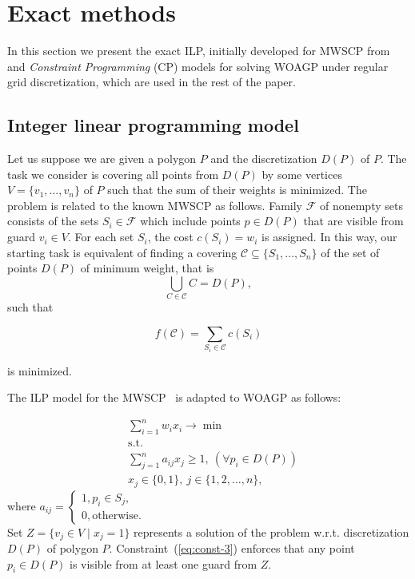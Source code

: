 \documentclass[runningheads,a4paper]{elsarticle}
\begin{document}
	\section{Exact methods}
	In this section we present the exact ILP,  initially developed for MWSCP from~\cite{vazirani2013approximation} and \emph{Constraint Programming} (CP) models for solving WOAGP  under regular grid discretization, which are used  in the rest of the paper.
	\subsection{Integer linear programming model}
	Let us suppose we are given a polygon $P$ and the discretization $D(P)$ of $P$.  The task we consider is covering all points from $D(P)$ by some vertices $V=\{v_1,...,v_n\}$ of $P$ such that the sum of their weights is minimized.
	The problem is related to the known MWSCP  as follows.
	Family $\mathcal{F}$ of nonempty sets consists of the sets
	$S_i \in \mathcal{F}$ which include points $p \in D(P)$ that are visible from guard $v_i\in V$.  For each set $S_i$, the cost $c(S_i) = w_i$ is assigned.  In this way, our starting task is equivalent of finding a  covering $\mathcal{C}\subseteq\{S_1,...,S_n\}$ of the set of points $D(P)$ of minimum weight, that is
	$$ \bigcup_{C \in \mathcal{C}} C = D(P),$$ such that

$$f(\mathcal{C}) = \sum_{S_i \in \mathcal{C}} c(S_i)$$

is minimized.

The ILP  model for the MWSCP~\cite{vazirani2013approximation}   is  adapted to WOAGP  as follows:

	\begin{align}
	&\sum_{i=1}^n w_ix_i \longrightarrow \min  \label{eq:woagp-min}\\
	&\mbox{s.t.}\nonumber \\
	&\sum_{j=1}^n a_{ij}x_j \geq 1,\ (\forall p_i\in D(P)) \label{eq:const-3}\\
	& x_j \in \{0,1\},\ j\in\{1,2,\ldots,n\}\label{eq:const-4},
	\end{align}
	where
	$a_{ij} = \begin{cases}
	1, p_i \in S_j, \\
	0, \mbox{otherwise}.
	\end{cases}$
	 \\

	Set $Z = \{v_j \in V\mid x_j=1\}$ represents a solution of the problem w.r.t. discretization $D(P)$ of polygon $P$.
	Constraint~(\ref{eq:const-3}) enforces that any point $p_i \in D(P)$ is visible from at least one guard from $Z$.
	
\end{document}
